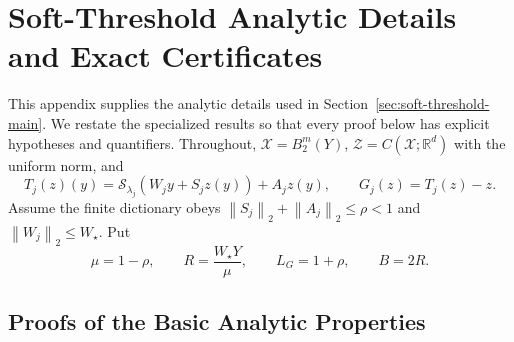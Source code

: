 \documentclass[twoside,11pt]{article}
\newcommand{\soft}{\mathcal{S}}
\newcommand{\norm}[1]{\left\lVert #1\right\rVert}
\begin{document}
\section{Soft-Threshold Analytic Details and Exact Certificates}
\label{app:soft-details}
\label{app:soft-threshold-proofs}

This appendix supplies the analytic details used in
Section~\ref{sec:soft-threshold-main}.  We restate the specialized results so
that every proof below has explicit hypotheses and quantifiers.  Throughout,
$\mathcal X=B_2^m(Y)$,
$\mathcal Z=C(\mathcal X;\mathbb R^d)$ with the uniform norm, and
\[
 T_j(z)(y)=\soft_{\lambda_j}(W_jy+S_jz(y))+A_jz(y),
 \qquad G_j(z)=T_j(z)-z.
\]
Assume the finite dictionary obeys
$\norm{S_j}_2+\norm{A_j}_2\le\rho<1$ and
$\norm{W_j}_2\le W_\star$.  Put
\begin{equation}
 \mu=1-\rho,
 \qquad R=\frac{W_\star Y}{\mu},
 \qquad L_G=1+\rho,
 \qquad B=2R.
 \label{soft:eq:constants}
\end{equation}


\subsection{Proofs of the Basic Analytic Properties}
\label{soft:app:wellposed}
\end{document}
